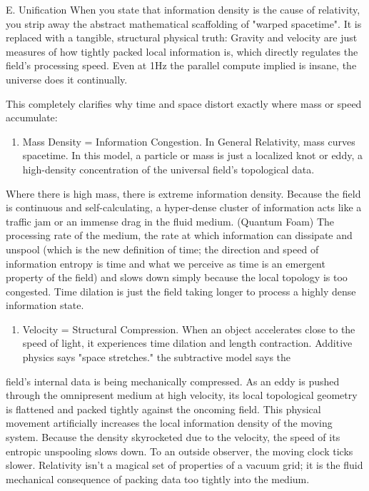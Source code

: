 E. Unification When you state that information density is the cause of relativity, you strip away the abstract mathematical scaffolding of "warped spacetime". It is replaced with a tangible, structural physical truth: Gravity and velocity are just measures of how tightly packed local information is, which directly regulates the field's processing speed. Even at 1Hz the parallel compute implied is insane, the universe does it continually.

This completely clarifies why time and space distort exactly where mass or speed accumulate:

\begin{enumerate}
\item Mass Density = Information Congestion. In General Relativity, mass curves spacetime. In this model, a particle or mass is just a localized knot or eddy, a high-density concentration of the universal field's topological data.
\end{enumerate}

Where there is high mass, there is extreme information density. Because the field is continuous and self-calculating, a hyper-dense cluster of information acts like a traffic jam or an immense drag in the fluid medium. (Quantum Foam) The processing rate of the medium, the rate at which information can dissipate and unspool (which is the new definition of time; the direction and speed of information entropy is time and what we perceive as time is an emergent property of the field) and slows down simply because the local topology is too congested. Time dilation is just the field taking longer to process a highly dense information state.

\begin{enumerate}
\item Velocity = Structural Compression. When an object accelerates close to the speed of light, it experiences time dilation and length contraction. Additive physics says "space stretches." the subtractive model says the
\end{enumerate}

field's internal data is being mechanically compressed. As an eddy is pushed through the omnipresent medium at high velocity, its local topological geometry is flattened and packed tightly against the oncoming field. This physical movement artificially increases the local information density of the moving system. Because the density skyrocketed due to the velocity, the speed of its entropic unspooling slows down. To an outside observer, the moving clock ticks slower. Relativity isn't a magical set of properties of a vacuum grid; it is the fluid mechanical consequence of packing data too tightly into the medium.

